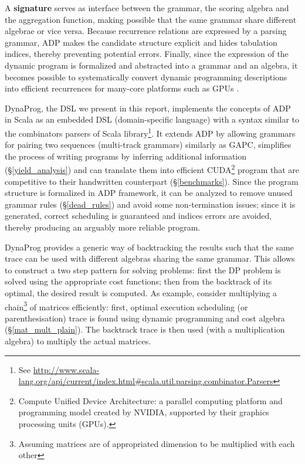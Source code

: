 A \textbf{signature} serves as interface between the grammar, the scoring algebra and the aggregation function, making possible that the same grammar share different algebrae or vice versa. Because recurrence relations are expressed by a parsing grammar, ADP makes the candidate structure explicit and hides tabulation indices, thereby preventing potential errors. Finally, since the expression of the dynamic program is formalized and abstracted into a grammar and an algebra, it becomes possible to systematically convert dynamic programming descriptions into efficient recurrences for many-core platforms such as GPUs \cite{adp_gpu}.

DynaProg, the DSL we present in this report, implements the concepts of ADP in Scala as an embedded DSL (domain-specific language) with a syntax similar to the combinators parsers of Scala library\footnote{See \url{http://www.scala-lang.org/api/current/index.html\#scala.util.parsing.combinator.Parsers}}. It extends ADP by allowing grammars for pairing two sequences (multi-track grammars) similarly as GAPC\cite{gapc_thesis}, simplifies the process of writing programs by inferring additional information (\S\ref{yield_analysis}) and can translate them into efficient CUDA\footnote{Compute Unified Device Architecture: a parallel computing platform and programming model created by NVIDIA, supported by their graphics processing units (GPUs).} program that are competitive to their handwritten counterpart (\S\ref{benchmarks}). Since the program structure is formalized in ADP framework, it can be analyzed to remove unused grammar rules (\S\ref{dead_rules}) and avoid some non-termination issues; since it is generated, correct scheduling is guaranteed and indices errors are avoided, thereby producing an arguably more reliable program.

DynaProg provides a generic way of backtracking the results such that the same trace can be used with different algebras sharing the same grammar. This allows to construct a two step pattern for solving problems: first the DP problem is solved using the appropriate cost functions; then from the backtrack of its optimal, the desired result is computed. As example, consider multiplying a chain\footnote{Assuming matrices are of appropriated dimension to be multiplied with each other} of matrices efficiently: first, optimal execution scheduling (or parenthesisation) trace is found using dynamic programming and cost algebra (\S\ref{mat_mult_plain}). The backtrack trace is then used (with a multiplication algebra) to multiply the actual matrices.

